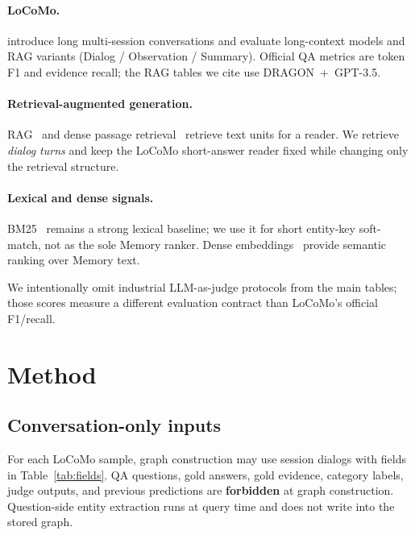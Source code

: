 \documentclass[11pt]{article}
\begin{document}
\paragraph{LoCoMo.}
\cite{maharana2024locomo} introduce long multi-session conversations and evaluate long-context models and RAG variants (Dialog / Observation / Summary).
Official QA metrics are token F1 and evidence recall; the RAG tables we cite use DRAGON~+~GPT-3.5.

\paragraph{Retrieval-augmented generation.}
RAG~\citep{lewis2020rag} and dense passage retrieval~\citep{karpukhin2020dpr} retrieve text units for a reader.
We retrieve \emph{dialog turns} and keep the LoCoMo short-answer reader fixed while changing only the retrieval structure.

\paragraph{Lexical and dense signals.}
BM25~\citep{robertson2009bm25} remains a strong lexical baseline; we use it for short entity-key soft-match, not as the sole Memory ranker.
Dense embeddings~\citep{openai2023embeddings} provide semantic ranking over Memory text.

We intentionally omit industrial LLM-as-judge protocols from the main tables; those scores measure a different evaluation contract than LoCoMo's official F1/recall.

\section{Method}
\label{sec:method}

\subsection{Conversation-only inputs}
\label{sec:inputs}

For each LoCoMo sample, graph construction may use session dialogs with fields in Table~\ref{tab:fields}.
QA questions, gold answers, gold evidence, category labels, judge outputs, and previous predictions are \textbf{forbidden} at graph construction.
Question-side entity extraction runs at query time and does not write into the stored graph.
\end{document}
